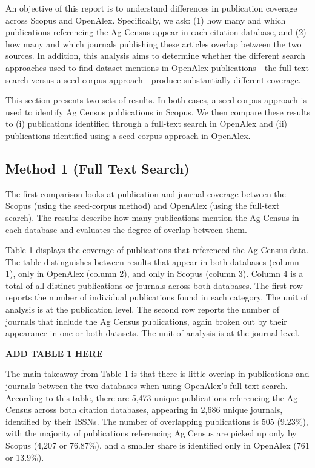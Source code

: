 \documentclass[
  letterpaper,
  DIV=11,
  numbers=noendperiod]{scrartcl}
\begin{document}
An objective of this report is to understand differences in publication
coverage across Scopus and OpenAlex. Specifically, we ask: (1) how many
and which publications referencing the Ag Census appear in each citation
database, and (2) how many and which journals publishing these articles
overlap between the two sources. In addition, this analysis aims to
determine whether the different search approaches used to find dataset
mentions in OpenAlex publications---the full-text search versus a
seed-corpus approach---produce substantially different coverage.

This section presents two sets of results. In both cases, a seed-corpus
approach is used to identify Ag Census publications in Scopus. We then
compare these results to (i) publications identified through a full-text
search in OpenAlex and (ii) publications identified using a seed-corpus
approach in OpenAlex.

\subsection{\texorpdfstring{\Large Method 1 (Full Text
Search)}{Method 1 (Full Text Search)}}\label{method-1-full-text-search}

The first comparison looks at publication and journal coverage between
the Scopus (using the seed-corpus method) and OpenAlex (using the
full-text search). The results describe how many publications mention
the Ag Census in each database and evaluates the degree of overlap
between them.

\pagebreak

Table 1 displays the coverage of publications that referenced the Ag
Census data. The table distinguishes between results that appear in both
databases (column 1), only in OpenAlex (column 2), and only in Scopus
(column 3). Column 4 is a total of all distinct publications or journals
across both databases. The first row reports the number of individual
publications found in each category. The unit of analysis is at the
publication level. The second row reports the number of journals that
include the Ag Census publications, again broken out by their appearance
in one or both datasets. The unit of analysis is at the journal level.

\textbf{ADD TABLE 1 HERE}

The main takeaway from Table 1 is that there is little overlap in
publications and journals between the two databases when using
OpenAlex's full-text search. According to this table, there are 5,473
unique publications referencing the Ag Census across both citation
databases, appearing in 2,686 unique journals, identified by their
ISSNs. The number of overlapping publications is 505 (9.23\%), with the
majority of publications referencing Ag Census are picked up only by
Scopus (4,207 or 76.87\%), and a smaller share is identified only in
OpenAlex (761 or 13.9\%).
\end{document}
